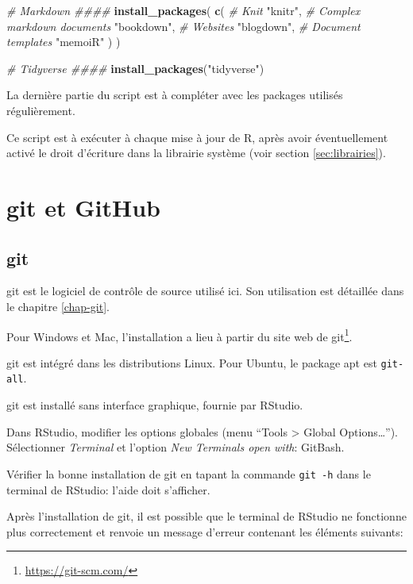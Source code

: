 \documentclass[
  12pt,
  french,
  a4paper,
  extrafontsizes,onecolumn,openright
  ]{memoir}
\newenvironment{Shaded}{\begin{snugshade}}{\end{snugshade}}
\newcommand{\CommentTok}[1]{\textcolor[rgb]{0.56,0.35,0.01}{\textit{#1}}}
\newcommand{\FunctionTok}[1]{\textcolor[rgb]{0.13,0.29,0.53}{\textbf{#1}}}
\newcommand{\NormalTok}[1]{#1}
\newcommand{\StringTok}[1]{\textcolor[rgb]{0.31,0.60,0.02}{#1}}
\newlength{\rf}
\begin{document}
\begin{Shaded}
\begin{Highlighting}[]
\CommentTok{\# Markdown \#\#\#\#}
\FunctionTok{install\_packages}\NormalTok{(}
  \FunctionTok{c}\NormalTok{(}
    \CommentTok{\# Knit}
    \StringTok{"knitr"}\NormalTok{,}
    \CommentTok{\# Complex markdown documents}
    \StringTok{"bookdown"}\NormalTok{,}
    \CommentTok{\# Websites}
    \StringTok{"blogdown"}\NormalTok{,}
    \CommentTok{\# Document templates}
    \StringTok{"memoiR"}
\NormalTok{  )}
\NormalTok{)}

\CommentTok{\# Tidyverse \#\#\#\#}
\FunctionTok{install\_packages}\NormalTok{(}\StringTok{"tidyverse"}\NormalTok{)}
\end{Highlighting}
\end{Shaded}

\normalsize

La dernière partie du script est à compléter avec les packages utilisés régulièrement.

Ce script est à exécuter à chaque mise à jour de R, après avoir éventuellement activé le droit d'écriture dans la librairie système (voir section \ref{sec:librairies}).

\section{git et GitHub}\label{git-et-github}

\subsection{git}\label{git}

git est le logiciel de contrôle de source utilisé ici.
Son utilisation est détaillée dans le chapitre \ref{chap-git}.

Pour Windows et Mac, l'installation a lieu à partir du site web de git\footnote{\url{https://git-scm.com/}}.

git est intégré dans les distributions Linux.
Pour Ubuntu, le package apt est \texttt{git-all}.

git est installé sans interface graphique, fournie par RStudio.

Dans RStudio, modifier les options globales (menu \enquote{Tools \textgreater{} Global Options\ldots{}}).
Sélectionner \emph{Terminal} et l'option \emph{New Terminals open with}: GitBash.

Vérifier la bonne installation de git en tapant la commande \texttt{git\ -h} dans le terminal de RStudio: l'aide doit s'afficher.

Après l'installation de git, il est possible que le terminal de RStudio ne fonctionne plus correctement et renvoie un message d'erreur contenant les éléments suivants:
\end{document}
